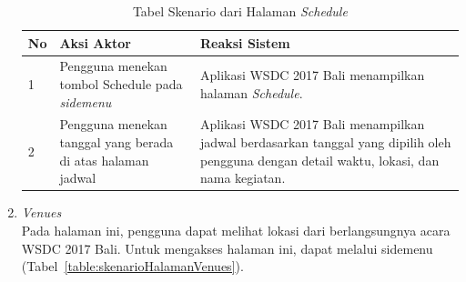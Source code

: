\begin{enumerate}
		\begin{table}[H]
			\centering
			\begin{tabular}{|p{0.5cm}|p{7cm}|p{7cm}|}
				\hline
				No & Aksi Aktor                               & Reaksi Sistem                                          \\ \hline
				1  & Pengguna menekan tombol Schedule pada \textit{sidemenu} & Aplikasi WSDC 2017 Bali menampilkan halaman \textit{Schedule}. \\ \hline
				2  & Pengguna menekan tanggal yang berada di atas halaman jadwal & Aplikasi WSDC 2017 Bali menampilkan jadwal berdasarkan tanggal yang dipilih oleh pengguna dengan detail waktu, lokasi, dan nama kegiatan. \\ \hline
			\end{tabular}
			\caption{Tabel Skenario dari Halaman \textit{Schedule}}
			\label{table:skenarioHalamanJadwal}
		\end{table}
	\item {\it Venues} \\ 
	Pada halaman ini, pengguna dapat melihat lokasi dari berlangsungnya acara WSDC 2017 Bali. Untuk mengakses halaman ini, dapat melalui sidemenu (Tabel~\ref{table:skenarioHalamanVenues}).

\end{enumerate}
